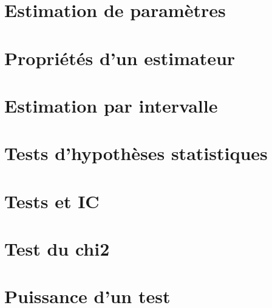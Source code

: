 \documentclass[letterpaper,10pt,english]{jupyterBook}
\begin{document}
\chapter{Estimation de paramètres}
\label{\detokenize{Statistique_inf_xe9rentielle/estimation_de_parametres:estimation-de-parametres}}\label{\detokenize{Statistique_inf_xe9rentielle/estimation_de_parametres::doc}}
\sphinxstepscope


\chapter{Propriétés d’un estimateur}
\label{\detokenize{Statistique_inf_xe9rentielle/proprietes_estimateur:proprietes-dun-estimateur}}\label{\detokenize{Statistique_inf_xe9rentielle/proprietes_estimateur::doc}}
\sphinxstepscope


\chapter{Estimation par intervalle}
\label{\detokenize{Statistique_inf_xe9rentielle/estimation_par_intervalle:estimation-par-intervalle}}\label{\detokenize{Statistique_inf_xe9rentielle/estimation_par_intervalle::doc}}
\sphinxstepscope


\chapter{Tests d’hypothèses statistiques}
\label{\detokenize{Statistique_inf_xe9rentielle/tests_hypotheses_statistiques:tests-dhypotheses-statistiques}}\label{\detokenize{Statistique_inf_xe9rentielle/tests_hypotheses_statistiques::doc}}
\sphinxstepscope


\chapter{Tests et IC}
\label{\detokenize{Statistique_inf_xe9rentielle/tests_et_ic:tests-et-ic}}\label{\detokenize{Statistique_inf_xe9rentielle/tests_et_ic::doc}}
\sphinxstepscope


\chapter{Test du chi2}
\label{\detokenize{Statistique_inf_xe9rentielle/test_chi2:test-du-chi2}}\label{\detokenize{Statistique_inf_xe9rentielle/test_chi2::doc}}
\sphinxstepscope


\chapter{Puissance d’un test}
\label{\detokenize{Statistique_inf_xe9rentielle/puissance_test:puissance-dun-test}}\label{\detokenize{Statistique_inf_xe9rentielle/puissance_test::doc}}
\sphinxstepscope
\end{document}
